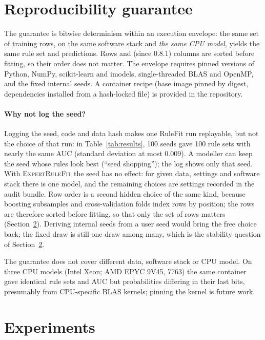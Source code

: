 \documentclass[11pt,a4paper]{article}
\theoremstyle{definition}\newtheorem{definition}{Definition}
\begin{document}
\section{Reproducibility guarantee}\label{sec:repro}

The guarantee is bitwise determinism within an execution envelope: the same set of training rows, on the same software stack and \emph{the same CPU model}, yields the same rule set and predictions. Rows and (since 0.8.1) columns are sorted before fitting, so their order does not matter. The envelope requires pinned versions of Python, NumPy, scikit-learn and imodels, single-threaded BLAS and OpenMP, and the fixed internal seeds. A container recipe (base image pinned by digest, dependencies installed from a hash-locked file) is provided in the repository.

\paragraph{Why not log the seed?} Logging the seed, code and data hash makes one RuleFit run replayable, but not the choice of that run: in Table~\ref{tab:results}, 100 seeds gave 100 rule sets with nearly the same AUC (standard deviation at most 0.009). A modeller can keep the seed whose rules look best (``seed shopping''); the log shows only that seed. With \textsc{ExpertRuleFit} the seed has no effect: for given data, settings and software stack there is one model, and the remaining choices are settings recorded in the audit bundle. Row order is a second hidden choice of the same kind, because boosting subsamples and cross-validation folds index rows by position; the rows are therefore sorted before fitting, so that only the set of rows matters (Section~\ref{sec:exp}). Deriving internal seeds from a user seed would bring the free choice back; the fixed draw is still one draw among many, which is the stability question of Section~\ref{sec:exp}.

The guarantee does not cover different data, software stack or CPU model. On three CPU models (Intel Xeon; AMD EPYC 9V45, 7763) the same container gave identical rule sets and AUC but probabilities differing in their last bits, presumably from CPU-specific BLAS kernels; pinning the kernel is future work.

\section{Experiments}\label{sec:exp}
\end{document}
